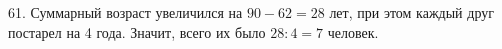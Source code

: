 61. Суммарный возраст увеличился на $90-62=28$ лет, при этом каждый друг постарел на 4 года. Значит, всего их было $28:4=7$ человек.\\
